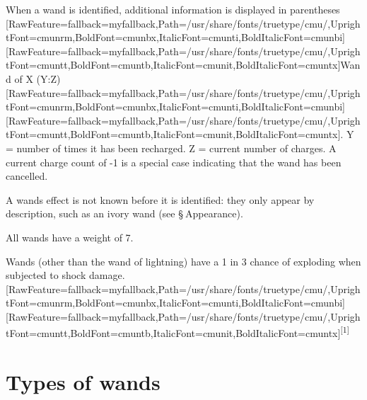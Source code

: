 When a wand is identified, additional information is displayed in parentheses {\ttfamily \allowbreak{}\setmainfont{cmuntt.ttf}[RawFeature={fallback=myfallback},Path=/usr/share/fonts/truetype/cmu/,UprightFont=cmunrm,BoldFont=cmunbx,ItalicFont=cmunti,BoldItalicFont=cmunbi]\setmonofont{cmuntt.ttf}[RawFeature={fallback=myfallback},Path=/usr/share/fonts/truetype/cmu/,UprightFont=cmuntt,BoldFont=cmuntb,ItalicFont=cmunit,BoldItalicFont=cmuntx]\ttfamily Wand of X (Y:Z)}\allowbreak{}\setmainfont{cmunrm.ttf}[RawFeature={fallback=myfallback},Path=/usr/share/fonts/truetype/cmu/,UprightFont=cmunrm,BoldFont=cmunbx,ItalicFont=cmunti,BoldItalicFont=cmunbi]\setmonofont{cmunrm.ttf}[RawFeature={fallback=myfallback},Path=/usr/share/fonts/truetype/cmu/,UprightFont=cmuntt,BoldFont=cmuntb,ItalicFont=cmunit,BoldItalicFont=cmuntx]. Y = number of times it has been recharged. Z = current number of charges. A current charge count of -{}1 is a special case indicating that the wand has been cancelled.


A wand\textquotesingle{}s effect is not known before it is identified: they only appear by description, such as an ivory wand (see §{\mbox{$~$}}Appearance\footnotemark[22]).


All wands have a weight of 7.


Wands (other than the wand of lightning\footnotemark[23]) have a 1 in 3 chance of exploding when subjected to shock\footnotemark[24] damage.\allowbreak{}\setmainfont{cmunrm.ttf}[RawFeature={fallback=myfallback},Path=/usr/share/fonts/truetype/cmu/,UprightFont=cmunrm,BoldFont=cmunbx,ItalicFont=cmunti,BoldItalicFont=cmunbi]\setmonofont{cmunrm.ttf}[RawFeature={fallback=myfallback},Path=/usr/share/fonts/truetype/cmu/,UprightFont=cmuntt,BoldFont=cmuntb,ItalicFont=cmunit,BoldItalicFont=cmuntx]\textsuperscript{{$\text{[}$}1{$\text{]}$}}





\section{Types of wands}
\label{1}

